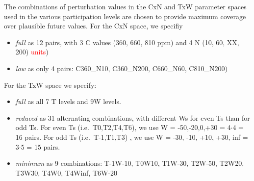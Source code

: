 \documentclass[gmd, manuscript]{copernicus} %
\begin{document}
The combinations of perturbation values in the CxN and TxW parameter spaces used in the various participation levels are chosen to provide maximum coverage over plausible future values. For the CxN space, we specifiy  
\begin{itemize}
\item \textit{full} as 12 pairs, with 3 C values (360, 660, 810 ppm) and 4 N (10, 60, XX, 200) \textcolor{red}{units})
\item \textit{low} as only 4 pairs: C360\_N10, C360\_N200, C660\_N60, C810\_N200) 
\end{itemize}
		
For the	TxW space we specify:
\begin{itemize}
\item \textit{full} as all 7 T levels and 9W levels.
\item \textit{reduced} as 31 alternating combinations, with different Ws for even Ts than for odd Ts. For even Ts (i.e.\ T0,T2,T4,T6), we use W = -50,-20,0,+30 = 4$\cdot$4 = 16 pairs. For odd Ts (i.e.\ T-1,T1,T3) , we use W = -30, -10, +10, +30, inf = 3$\cdot$5 = 15 pairs.
\item \textit{minimum} as 9 combinations: T-1W-10, T0W10, T1W-30, T2W-50, T2W20, T3W30, T4W0, T4Winf, T6W-20
\end{itemize}
\end{document}
